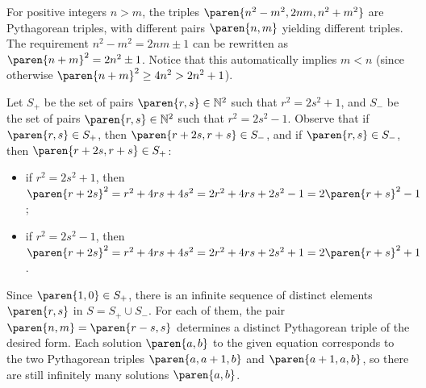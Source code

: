 For positive integers $n > m$, the triples $\paren{n^2 - m^2, 2 n m, n^2 + m^2}$ are Pythagorean triples,
with different pairs $\paren{n, m}$ yielding different triples.
The requirement $n^2 - m^2 = 2 n m \pm 1$ can be rewritten as $\paren{n + m}^2 = 2 n^2 \pm 1$.
Notice that this automatically implies $m < n$ (since otherwise $\paren{n + m}^2 \geq 4 n^2 > 2 n^2 + 1$).

Let $S_{+}$ be the set of pairs $\paren{r, s} \in \mathbb{N}^2$ such that $r^2 = 2 s^2 + 1$,
and $S_{-}$ be the set of pairs $\paren{r, s} \in \mathbb{N}^2$ such that $r^2 = 2 s^2 - 1$.
Observe that if $\paren{r, s} \in S_{+}$, then $\paren{r + 2 s, r + s} \in S_{-}$,
and if $\paren{r, s} \in S_{-}$, then $\paren{r + 2 s, r + s} \in S_{+}$:
\begin{itemize}
  \item[--] if $r^2 = 2 s^2 + 1$, then $\paren{r + 2 s}^2 = r^2 + 4 r s + 4 s^2 = 2 r^2 + 4 r s + 2 s^2 - 1 = 2 \paren{r + s}^2 - 1$;
  \item[--] if $r^2 = 2 s^2 - 1$, then $\paren{r + 2 s}^2 = r^2 + 4 r s + 4 s^2 = 2 r^2 + 4 r s + 2 s^2 + 1 = 2 \paren{r + s}^2 + 1$.
\end{itemize}
Since $\paren{1, 0} \in S_{+}$, there is an infinite sequence of distinct elements $\paren{r, s}$ in $S = S_{+} \cup S_{-}$.
For each of them, the pair $\paren{n, m} = \paren{r - s, s}$ determines a distinct Pythagorean triple of the desired form.
Each solution $\paren{a, b}$ to the given equation corresponds to the two Pythagorean triples $\paren{a, a + 1, b}$ and $\paren{a + 1, a, b}$,
so there are still infinitely many solutions $\paren{a, b}$.
